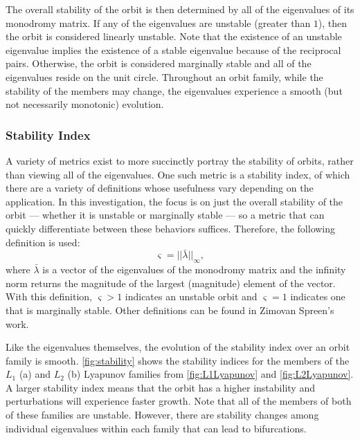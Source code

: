 The overall stability of the orbit is then determined by all of the eigenvalues of its monodromy
matrix. If any of the eigenvalues are unstable (greater than $1$), then the orbit is considered
linearly unstable. Note that the existence of an unstable eigenvalue implies the existence of a
stable eigenvalue because of the reciprocal pairs. Otherwise, the orbit is considered marginally
stable and all of the eigenvalues reside on the unit circle. Throughout an orbit family, while the
stability of the members may change, the eigenvalues experience a smooth (but not necessarily
monotonic) evolution.

\subsubsection{Stability Index}
A variety of metrics exist to more succinctly portray the stability of orbits, rather than viewing
all of the eigenvalues. One such metric is a stability index, of which there are a variety of
definitions whose usefulness vary depending on the application. In this investigation, the focus is
on just the overall stability of the orbit --- whether it is unstable or marginally stable --- so a
metric that can quickly differentiate between these behaviors suffices. Therefore, the following
definition is used\cite{Power:2019}:
\begin{equation}
    \varsigma=||\bar{\lambda}||_{\infty},
    \label{eq:stabilityindex}
\end{equation}
where $\bar{\lambda}$ is a vector of the eigenvalues of the monodromy matrix and the infinity norm
returns the magnitude of the largest (magnitude) element of the vector. With this definition,
$\varsigma>1$ indicates an unstable orbit and $\varsigma=1$ indicates one that is marginally
stable. Other definitions can be found in Zimovan Spreen's work\cite{ZimovanSpreen:2021}.

Like the eigenvalues themselves, the evolution of the stability index over an orbit family is
smooth. \cref{fig:stability} shows the stability indices for the members of the $L_{1}$ (a) and
$L_{2}$ (b) Lyapunov families from \cref{fig:L1Lyapunov} and \cref{fig:L2Lyapunov}. A larger
stability index means that the orbit has a higher instability and perturbations will experience
faster growth. Note that all of the members of both of these families are unstable. However, there
are stability changes among individual eigenvalues within each family that can lead to
bifurcations.

